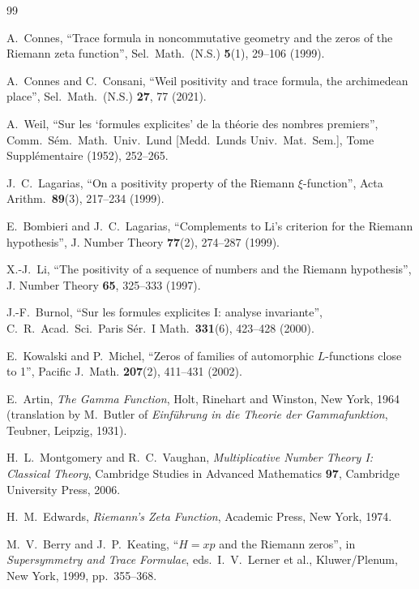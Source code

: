 \documentclass[11pt]{article}
\begin{document}
\newpage
\begin{thebibliography}{99}

A.~Connes,
``Trace formula in noncommutative geometry and the zeros of
the Riemann zeta function'',
Sel.\ Math.\ (N.S.) \textbf{5}(1), 29--106 (1999).

A.~Connes and C.~Consani,
``Weil positivity and trace formula, the archimedean place'',
Sel.\ Math.\ (N.S.) \textbf{27}, 77 (2021).

A.~Weil,
``Sur les `formules explicites' de la th\'eorie des nombres
premiers'',
Comm.\ S\'em.\ Math.\ Univ.\ Lund [Medd.\ Lunds Univ.\ Mat.\ Sem.],
Tome Suppl\'ementaire (1952), 252--265.

J.~C.~Lagarias,
``On a positivity property of the Riemann $\xi$-function'',
Acta Arithm.\ \textbf{89}(3), 217--234 (1999).

E.~Bombieri and J.~C.~Lagarias,
``Complements to Li's criterion for the Riemann hypothesis'',
J. Number Theory \textbf{77}(2), 274--287 (1999).

X.-J.~Li,
``The positivity of a sequence of numbers and the Riemann
hypothesis'',
J. Number Theory \textbf{65}, 325--333 (1997).

J.-F.~Burnol,
``Sur les formules explicites I: analyse invariante'',
C.\ R.\ Acad.\ Sci.\ Paris S\'er.\ I Math.\ \textbf{331}(6),
423--428 (2000).

E.~Kowalski and P.~Michel,
``Zeros of families of automorphic $L$-functions close to 1'',
Pacific J.\ Math. \textbf{207}(2), 411--431 (2002).

E.~Artin,
\emph{The Gamma Function},
Holt, Rinehart and Winston, New York, 1964
(translation by M.~Butler of \emph{Einf\"uhrung in die Theorie
der Gammafunktion}, Teubner, Leipzig, 1931).

H.~L.~Montgomery and R.~C.~Vaughan,
\emph{Multiplicative Number Theory I: Classical Theory},
Cambridge Studies in Advanced Mathematics \textbf{97},
Cambridge University Press, 2006.

H.~M.~Edwards,
\emph{Riemann's Zeta Function},
Academic Press, New York, 1974.

M.~V.~Berry and J.~P.~Keating,
``$H=xp$ and the Riemann zeros'',
in \emph{Supersymmetry and Trace Formulae},
eds.\ I.~V.~Lerner et al.,
Kluwer/Plenum, New York, 1999, pp.\ 355--368.


\end{thebibliography}
\end{document}
